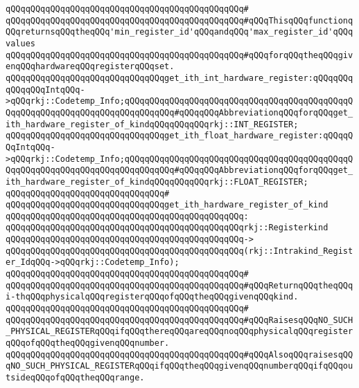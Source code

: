 \verb|qQQqqQQqqQQqqQQqqQQqqQQqqQQqqQQqqQQqqQQqqQQqqQQq#|\newline
\verb|qQQqqQQqqQQqqQQqqQQqqQQqqQQqqQQqqQQqqQQqqQQqqQQq#qQQqThisqQQqfunctionqQQqreturnsqQQqtheqQQq'min_register_id'qQQqandqQQq'max_register_id'qQQqvalues|\newline
\verb|qQQqqQQqqQQqqQQqqQQqqQQqqQQqqQQqqQQqqQQqqQQqqQQq#qQQqforqQQqtheqQQqgivenqQQqhardwareqQQqregisterqQQqset.|\newline
\newline
\newline
\verb|qQQqqQQqqQQqqQQqqQQqqQQqqQQqqQQqget_ith_int_hardware_register:qQQqqQQqqQQqqQQqIntqQQq->qQQqrkj::Codetemp_Info;qQQqqQQqqQQqqQQqqQQqqQQqqQQqqQQqqQQqqQQqqQQqqQQqqQQqqQQqqQQqqQQqqQQqqQQqqQQqqQQq#qQQqqQQqAbbreviationqQQqforqQQqget_ith_hardware_register_of_kindqQQqqQQqqQQqrkj::INT_REGISTER;|\newline
\verb|qQQqqQQqqQQqqQQqqQQqqQQqqQQqqQQqget_ith_float_hardware_register:qQQqqQQqIntqQQq->qQQqrkj::Codetemp_Info;qQQqqQQqqQQqqQQqqQQqqQQqqQQqqQQqqQQqqQQqqQQqqQQqqQQqqQQqqQQqqQQqqQQqqQQqqQQqqQQq#qQQqqQQqAbbreviationqQQqforqQQqget_ith_hardware_register_of_kindqQQqqQQqqQQqrkj::FLOAT_REGISTER;|\newline
\verb|qQQqqQQqqQQqqQQqqQQqqQQqqQQqqQQq#|\newline
\verb|qQQqqQQqqQQqqQQqqQQqqQQqqQQqqQQqget_ith_hardware_register_of_kind|\newline
\verb|qQQqqQQqqQQqqQQqqQQqqQQqqQQqqQQqqQQqqQQqqQQqqQQq:|\newline
\verb|qQQqqQQqqQQqqQQqqQQqqQQqqQQqqQQqqQQqqQQqqQQqqQQqrkj::Registerkind|\newline
\verb|qQQqqQQqqQQqqQQqqQQqqQQqqQQqqQQqqQQqqQQqqQQqqQQq->|\newline
\verb|qQQqqQQqqQQqqQQqqQQqqQQqqQQqqQQqqQQqqQQqqQQqqQQq(rkj::Intrakind_Register_IdqQQq->qQQqrkj::Codetemp_Info);|\newline
\verb|qQQqqQQqqQQqqQQqqQQqqQQqqQQqqQQqqQQqqQQqqQQqqQQq#|\newline
\verb|qQQqqQQqqQQqqQQqqQQqqQQqqQQqqQQqqQQqqQQqqQQqqQQq#qQQqReturnqQQqtheqQQqi-thqQQqphysicalqQQqregisterqQQqofqQQqtheqQQqgivenqQQqkind.|\newline
\verb|qQQqqQQqqQQqqQQqqQQqqQQqqQQqqQQqqQQqqQQqqQQqqQQq#|\newline
\verb|qQQqqQQqqQQqqQQqqQQqqQQqqQQqqQQqqQQqqQQqqQQqqQQq#qQQqRaisesqQQqNO_SUCH_PHYSICAL_REGISTERqQQqifqQQqthereqQQqareqQQqnoqQQqphysicalqQQqregisterqQQqofqQQqtheqQQqgivenqQQqnumber.|\newline
\verb|qQQqqQQqqQQqqQQqqQQqqQQqqQQqqQQqqQQqqQQqqQQqqQQq#qQQqAlsoqQQqraisesqQQqNO_SUCH_PHYSICAL_REGISTERqQQqifqQQqtheqQQqgivenqQQqnumberqQQqifqQQqoutsideqQQqofqQQqtheqQQqrange.|\newline
